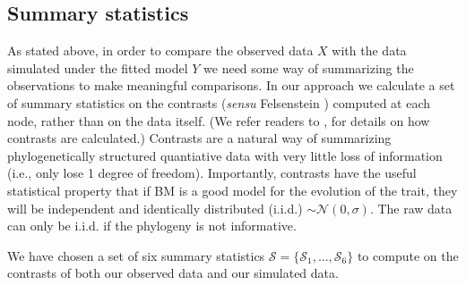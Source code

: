 \documentclass[a4paper,12pt]{article}
\begin{document}
\subsection{Summary statistics}
As stated above, in order to compare the observed data $X$ with the data simulated under the fitted model $Y$ we need some way of summarizing the observations to make meaningful comparisons. 
In our approach we calculate a set of summary statistics on the contrasts (\textit{sensu} Felsenstein \citep{Felsenstein1985}) computed at each node, rather than on the data itself. (We refer readers to \citep{Felsenstein1985, Rohlf2001, Blomberg2012}, for details on how contrasts are calculated.) Contrasts are a natural way of summarizing phylogenetically structured quantiative data with very little loss of information (i.e., only lose 1 degree of freedom). Importantly, contrasts have the useful statistical property that if BM is a good model for the evolution of the trait, they will be independent and identically distributed (i.i.d.) $\sim \mathcal{N}(0, \sigma)$. The raw data can only be i.i.d. if the phylogeny is not informative. 

We have chosen a set of six summary statistics $\mathcal{S} = \lbrace \mathcal{S}_1, \ldots, \mathcal{S}_6 \rbrace$ to compute on the contrasts of both our observed data and our simulated data.
\end{document}
